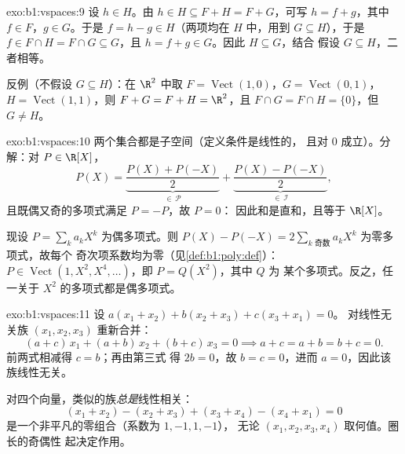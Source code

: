 \begin{solution}{exo:b1:vspaces:9}
设 $h \in H$。由 $h \in H \subseteq F + H = F + G$，可写 $h = f
+ g$，其中 $f \in F$，$g \in G$。于是 $f = h - g \in H$（两项均在
$H$ 中，用到 $G \subseteq H$），于是 $f \in F \cap H = F \cap G
\subseteq G$，且 $h = f + g \in G$。因此 $H \subseteq G$，结合
假设 $G \subseteq H$，二者相等。

反例（不假设 $G \subseteq H$）：在 $\R^2$ 中取 $F =
\operatorname{Vect}(1,0)$，$G = \operatorname{Vect}(0,1)$，$H =
\operatorname{Vect}(1,1)$，则 $F + G = F + H = \R^2$，且 $F \cap G
= F \cap H = \{0\}$，但 $G \neq H$。
\end{solution}

\begin{solution}{exo:b1:vspaces:10}
两个集合都是子空间（定义条件是线性的，
且对 $0$ 成立）。分解：对 $P \in \R[X]$，
\[
P(X) = \underbrace{\frac{P(X) + P(-X)}{2}}_{\in\,\mathcal P}
+ \underbrace{\frac{P(X) - P(-X)}{2}}_{\in\,\mathcal I},
\]
且既偶又奇的多项式满足 $P = -P$，故 $P = 0$：
因此和是直和，且等于 $\R[X]$。

现设 $P = \sum_k a_k X^k$ 为偶多项式。则 $P(X) - P(-X) = 2
\sum_{k \text{ 奇数}} a_k X^k$ 为零多项式，故每个
奇次项系数均为零（见\cref{def:b1:poly:def}）：$P \in
\operatorname{Vect}(1, X^2, X^4, \dots)$，即 $P = Q(X^2)$，其中 $Q$ 为
某个多项式。反之，任一关于 $X^2$ 的多项式都是偶多项式。
\end{solution}

\begin{solution}{exo:b1:vspaces:11}
设 $a(x_1 + x_2) + b(x_2 + x_3) + c(x_3 + x_1) = 0$。
对线性无关族 $(x_1, x_2, x_3)$ 重新合并：
\[
(a + c)\,x_1 + (a + b)\,x_2 + (b + c)\,x_3 = 0
\implies a + c = a + b = b + c = 0 .
\]
前两式相减得 $c = b$；再由第三式
得 $2b = 0$，故 $b = c = 0$，进而 $a = 0$，因此该族线性无关。

对四个向量，类似的族\emph{总是}线性相关：
\[
(x_1 + x_2) - (x_2 + x_3) + (x_3 + x_4) - (x_4 + x_1) = 0
\]
是一个非平凡的零组合（系数为 $1, -1, 1, -1$），
无论 $(x_1, x_2, x_3, x_4)$ 取何值。圈长的奇偶性
起决定作用。
\end{solution}

